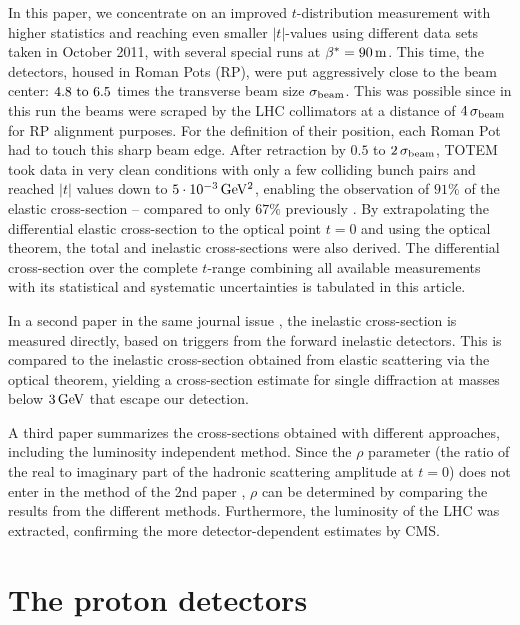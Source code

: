 \documentclass[doublecol]{../macros/epl2}
\def\un#1{\,{\rm #1}}
\begin{document}
In this paper, we concentrate on an improved $t$-distribution measurement with higher statistics and reaching even smaller $|t|$-values using different data sets taken in October 2011, with several special runs at $\beta^* = 90\un{m}$. This time, the detectors, housed in Roman Pots (RP), were put aggressively close to the beam center: $4.8 \hbox{ to } 6.5$ times the transverse beam size $\sigma_{\rm beam}$. This was possible since in this run the beams were scraped by the LHC collimators at a distance of $4\,\sigma_{\rm beam}$ for RP alignment purposes. For the definition of their position, each Roman Pot had to touch this sharp beam edge. After retraction by $0.5$ to $2\,\sigma_{\rm beam}$, TOTEM took data in very clean conditions with only a few colliding bunch pairs and reached $|t|$ values down to $5\cdot10^{-3}\un{GeV^2}$, enabling the observation of $91\%$ of the elastic cross-section -- compared to only $67\%$ previously \cite{epl96}. By extrapolating the differential elastic cross-section to the optical point $t=0$ and using the optical theorem, the total and inelastic cross-sections were also derived. The differential cross-section over the complete $t$-range combining all available measurements with its statistical and systematic uncertainties is tabulated in this article.

\vskip4cm

In a second paper in the same journal issue \cite{P2}, the inelastic cross-section is measured directly, based on triggers from the forward inelastic detectors. This is compared to the inelastic cross-section obtained from elastic scattering via the optical theorem, yielding a cross-section estimate for single diffraction at masses below $3\un{GeV}$ that escape our detection.

A third paper \cite{P3} summarizes the cross-sections obtained with different approaches, including the luminosity independent method. Since the $\rho$ parameter (the ratio of the real to imaginary part of the hadronic scattering amplitude at $t=0$) does not enter in the method of the 2nd paper \cite{P2}, $\rho$ can be determined by comparing the results from the different methods. Furthermore, the luminosity of the LHC was extracted, confirming the more detector-dependent estimates by CMS. 



\section{The proton detectors}
\end{document}
